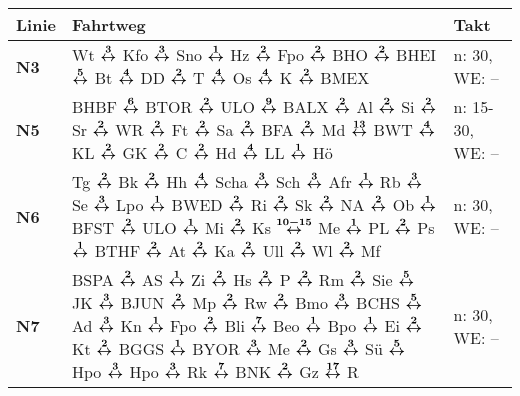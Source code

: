 \begin{minipage}[t]{0.05\textwidth}
\phantom{Tor}
\end{minipage}
\begin{minipage}[t]{0.45\textwidth}
\begin{tabular}{>{\bfseries}L{1.2cm}L{9.0cm}L{3.0cm}}
{\bfseries Linie} & {\bfseries Fahrtweg} & {\bfseries Takt} \\
\hline
\nbus{} N3    & Wt $\xarwe{3}$ Kfo $\xarwe{3}$ Sno $\xarwe{1}$ Hz $\xarwe{2}$ Fpo $\xarwe{2}$ BHO $\xarwe{2}$ BHEI $\xarwe{5}$ Bt $\xarwe{4}$ DD $\xarwe{2}$ T $\xarwe{4}$ Os       %
                $\xarwe{4}$ K $\xarwe{2}$ BMEX                                                                                                                                      & n: 30, WE: --              \\
\nbus{} N5    & BHBF $\xarwe{6}$ BTOR $\xarwe{2}$ ULO $\xarwe{9}$ BALX $\xarwe{2}$ Al $\xarwe{2}$ Si $\xarwe{2}$ Sr $\xarwe{2}$ WR $\xarwe{2}$ Ft $\xarwe{2}$ Sa $\xarwe{2}$ BFA $\xarwe{2}$ Md $\xarwe{13}$ BWT $\xarwe{4}$ KL     %
                $\xarwe{2}$ GK $\xarwe{2}$ C $\xarwe{2}$ Hd $\xarwe{4}$ LL $\xarwe{1}$ Hö
                & n: 15-30, WE: --           \\
\nbus{} N6    & Tg $\xarwe{2}$ Bk $\xarwe{2}$ Hh $\xarwe{4}$ Scha $\xarwe{3}$ Sch $\xarwe{3}$ Afr $\xarwe{1}$ Rb $\xarwe{3}$ Se $\xarwe{3}$ Lpo $\xarwe{1}$ BWED $\xarwe{2}$ Ri     %
                $\xarwe{2}$ Sk $\xarwe{2}$ NA $\xarwe{2}$ Ob $\xarwe{1}$ BFST $\xarwe{2}$ ULO $\xarwe{1}$ Mi $\xarwe{2}$ Ks $\xarwe{10-15}$ Me $\xarwe{1}$ PL $\xarwe{2}$ Ps        %
                $\xarwe{1}$ BTHF $\xarwe{2}$ At $\xarwe{2}$ Ka $\xarwe{2}$ Ull $\xarwe{2}$ Wl $\xarwe{2}$ Mf                                                                        & n: 30, WE: --              \\
\nbus{} N7    & BSPA $\xarwe{2}$ AS $\xarwe{1}$ Zi $\xarwe{2}$ Hs $\xarwe{2}$ P $\xarwe{2}$ Rm $\xarwe{2}$ Sie $\xarwe{5}$ JK $\xarwe{3}$ BJUN $\xarwe{2}$ Mp $\xarwe{2}$ Rw        %
                $\xarwe{2}$ Bmo $\xarwe{3}$ BCHS $\xarwe{5}$ Ad $\xarwe{3}$ Kn $\xarwe{1}$ Fpo $\xarwe{2}$ Bli $\xarwe{7}$ Beo $\xarwe{1}$ Bpo $\xarwe{1}$ Ei $\xarwe{2}$ Kt        %
                $\xarwe{2}$ BGGS $\xarwe{1}$ BYOR $\xarwe{3}$ Me $\xarwe{2}$ Gs $\xarwe{3}$ Sü $\xarwe{5}$ Hpo $\xarwe{3}$ Hpo $\xarwe{3}$ Rk $\xarwe{7}$ BNK $\xarwe{2}$ Gz        %
                $\xarwe{17}$ R                                                                                                                                                      & n: 30, WE: --              \\

\end{tabular}
\end{minipage}
